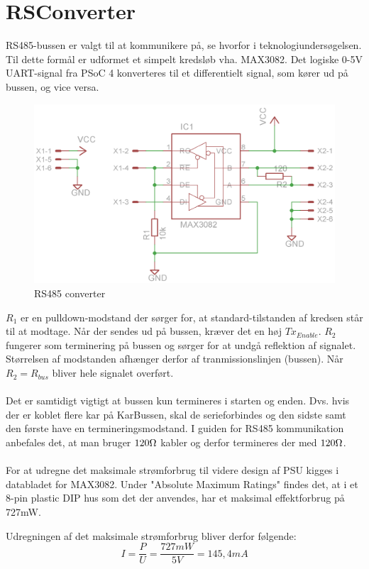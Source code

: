 \section{RSConverter}
RS485-bussen er valgt til at kommunikere på, se hvorfor i teknologiundersøgelsen. Til dette formål er udformet et simpelt kredsløb vha. MAX3082. Det logiske 0-5V UART-signal fra PSoC 4 konverteres til et differentielt signal, som kører ud på bussen, og vice versa.

\begin{figure}[H]
	\centering
	\includegraphics[scale=1]{../Hardware/RS485_Converter/Schematic}
	\caption{RS485 converter}
	\label{photo:RS485converter}
\end{figure}

$R_1$ er en pulldown-modstand der sørger for, at standard-tilstanden af kredsen står til at modtage. Når der sendes ud på bussen, kræver det en høj $Tx_{Enable}$. $R_2$ fungerer som terminering på bussen og sørger for at undgå reflektion af signalet. Størrelsen af modstanden afhænger derfor af tranmissionslinjen (bussen). Når $R_2 = R_{bus}$ bliver hele signalet overført. 
\\\\
Det er samtidigt vigtigt at bussen kun termineres i starten og enden. Dvs. hvis der er koblet flere kar på KarBussen, skal de serieforbindes og den sidste samt den første have en termineringsmodstand. I guiden for RS485 kommunikation anbefales det, at man bruger $120\ohm$ kabler og derfor termineres der med $120\ohm$. 
\\\\
For at udregne det maksimale strømforbrug til videre design af PSU kigges i databladet for MAX3082. Under "Absolute Maximum Ratings" findes det, at i et 8-pin plastic DIP hus som det der anvendes, har et maksimal effektforbrug på 727mW.

Udregningen af det maksimale strømforbrug bliver derfor følgende:
\begin{equation}
	I = \frac{P}{U} = \frac{727mW}{5V} = 145,4mA
\end{equation}

